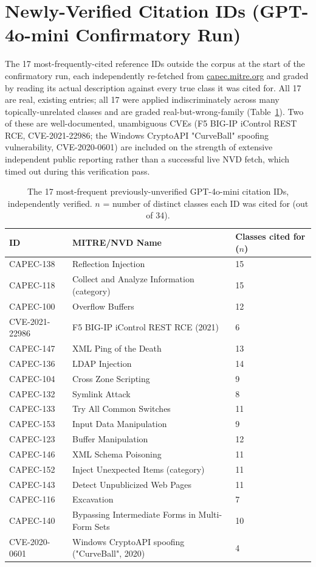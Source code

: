 \documentclass[twocolumn]{svjour3}
\begin{document}
\appendix
\section{Newly-Verified Citation IDs (GPT-4o-mini Confirmatory Run)}
\label{sec:appendix}

The 17 most-frequently-cited reference IDs outside the corpus at the start of the confirmatory
run, each independently re-fetched from \url{capec.mitre.org} and graded by reading its actual
description against every true class it was cited for. All 17 are real, existing entries; all 17
were applied indiscriminately across many topically-unrelated classes and are graded
real-but-wrong-family (Table~\ref{tab:newids}). Two of these are well-documented, unambiguous CVEs
(F5 BIG-IP iControl REST RCE, CVE-2021-22986; the Windows CryptoAPI "CurveBall" spoofing
vulnerability, CVE-2020-0601) are included on the strength of extensive independent public
reporting rather than a successful live NVD fetch, which timed out during this verification pass.

\begin{table}[t]
\centering
\caption{The 17 most-frequent previously-unverified GPT-4o-mini citation IDs, independently
verified. $n$ = number of distinct classes each ID was cited for (out of 34).}
\label{tab:newids}
\begin{tabular}{lll}
\toprule
ID & MITRE\slash NVD Name & Classes cited for ($n$) \\
\midrule
CAPEC-138 & Reflection Injection & 15 \\
CAPEC-118 & Collect and Analyze Information (category) & 15 \\
CAPEC-100 & Overflow Buffers & 12 \\
CVE-2021-22986 & F5 BIG-IP iControl REST RCE (2021) & 6 \\
CAPEC-147 & XML Ping of the Death & 13 \\
CAPEC-136 & LDAP Injection & 14 \\
CAPEC-104 & Cross Zone Scripting & 9 \\
CAPEC-132 & Symlink Attack & 8 \\
CAPEC-133 & Try All Common Switches & 11 \\
CAPEC-153 & Input Data Manipulation & 9 \\
CAPEC-123 & Buffer Manipulation & 12 \\
CAPEC-146 & XML Schema Poisoning & 11 \\
CAPEC-152 & Inject Unexpected Items (category) & 11 \\
CAPEC-143 & Detect Unpublicized Web Pages & 11 \\
CAPEC-116 & Excavation & 7 \\
CAPEC-140 & Bypassing Intermediate Forms in Multi-Form Sets & 10 \\
CVE-2020-0601 & Windows CryptoAPI spoofing ("CurveBall", 2020) & 4 \\
\bottomrule
\end{tabular}
\end{table}
\end{document}

